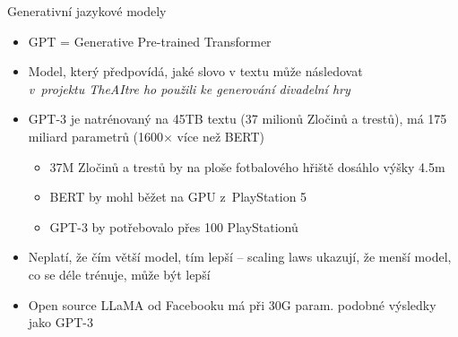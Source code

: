 \documentclass[aspectratio=169,dvipsnames]{beamer}
\begin{document}
\begin{frame}{Generativní jazykové modely}

    \begin{itemize}[<+->]

        \item GPT = Generative Pre-trained Transformer

        \item Model, který předpovídá, jaké slovo v textu může následovat \\
            \it v~projektu TheAItre ho použili ke generování divadelní hry

        \item GPT-3 je natrénovaný na 45TB textu (37 milionů Zločinů a trestů),
            má 175 miliard parametrů (1600$\times$ více než BERT)

            \begin{itemize}[<+->]

                \item 37M Zločinů a trestů by na ploše fotbalového hřiště
                    dosáhlo výšky 4.5m

                \item BERT by mohl běžet na GPU z~PlayStation 5

                \item GPT-3 by potřebovalo přes 100 PlayStationů

            \end{itemize}


		\item Neplatí, že čím větší model, tím lepší -- scaling laws ukazují,
				že menší model, co se déle trénuje, může být lepší

		\item Open source LLaMA od Facebooku má při 30G param. podobné výsledky jako GPT-3

    \end{itemize}

\end{frame}

\end{document}

